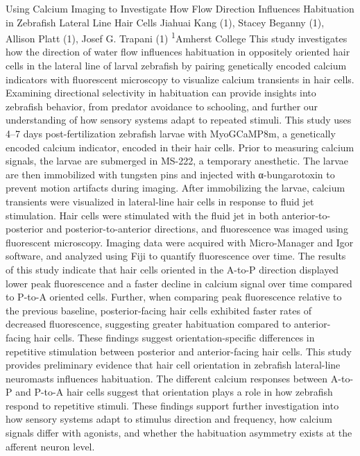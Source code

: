 \makeabstract
{
Using Calcium Imaging to Investigate How Flow Direction Influences Habituation in Zebrafish Lateral Line Hair Cells
}
{
Jiahuai Kang (1), Stacey Beganny (1), Allison Platt (1), Josef G. Trapani (1)
}
{
\textsuperscript{1}Amherst College
}
{
This study investigates how the direction of water flow influences habituation in oppositely oriented hair cells in the lateral line of larval zebrafish by pairing genetically encoded calcium indicators with fluorescent microscopy to visualize calcium transients in hair cells. Examining directional selectivity in habituation can provide insights into zebrafish behavior, from predator avoidance to schooling, and further our understanding of how sensory systems adapt to repeated stimuli.
}
{
This study uses 4–7 days post-fertilization zebrafish larvae with MyoGCaMP8m, a genetically encoded calcium indicator, encoded in their hair cells. Prior to measuring calcium signals, the larvae are submerged in MS-222, a temporary anesthetic. The larvae are then immobilized with tungsten pins and injected with α-bungarotoxin to prevent motion artifacts during imaging. After immobilizing the larvae, calcium transients were visualized in lateral-line hair cells in response to fluid jet stimulation. Hair cells were stimulated with the fluid jet in both anterior-to-posterior and posterior-to-anterior directions, and fluorescence was imaged using fluorescent microscopy. Imaging data were acquired with Micro-Manager and Igor software, and analyzed using Fiji to quantify fluorescence over time.
}
{
The results of this study indicate that hair cells oriented in the A-to-P direction displayed lower peak fluorescence and a faster decline in calcium signal over time compared to P-to-A oriented cells. Further, when comparing peak fluorescence relative to the previous baseline, posterior-facing hair cells exhibited faster rates of decreased fluorescence, suggesting greater habituation compared to anterior-facing hair cells. These findings suggest orientation-specific differences in repetitive stimulation between posterior and anterior-facing hair cells.
}
{
This study provides preliminary evidence that hair cell orientation in zebrafish lateral-line neuromasts influences habituation. The different calcium responses between A-to-P and P-to-A hair cells suggest that orientation plays a role in how zebrafish respond to repetitive stimuli. These findings support further investigation into how sensory systems adapt to stimulus direction and frequency, how calcium signals differ with agonists, and whether the habituation asymmetry exists at the afferent neuron level.
}

\newpage

